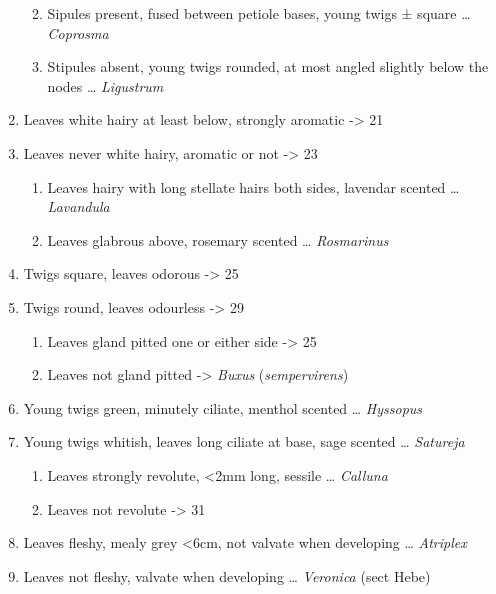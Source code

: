 \documentclass[openany]{book}
\providecommand{\tightlist}{%
  \setlength{\itemsep}{0pt}\setlength{\parskip}{0pt}}
\begin{document}
\begin{enumerate}
  \begin{enumerate}
  \def\labelenumii{\arabic{enumii}.}
  \setcounter{enumii}{16}
  \tightlist
  \item
    Sipules present, fused between petiole bases, young twigs ± square \ldots{} \emph{Coprosma}
  \item
    Stipules absent, young twigs rounded, at most angled slightly below the nodes \ldots{} \emph{Ligustrum}
  \end{enumerate}
\item
  Leaves white hairy at least below, strongly aromatic -\textgreater{} 21
\item
  Leaves never white hairy, aromatic or not -\textgreater{} 23

  \begin{enumerate}
  \def\labelenumii{\arabic{enumii}.}
  \setcounter{enumii}{20}
  \tightlist
  \item
    Leaves hairy with long stellate hairs both sides, lavendar scented \ldots{} \emph{Lavandula}
  \item
    Leaves glabrous above, rosemary scented \ldots{} \emph{Rosmarinus}
  \end{enumerate}
\item
  Twigs square, leaves odorous -\textgreater{} 25
\item
  Twigs round, leaves odourless -\textgreater{} 29

  \begin{enumerate}
  \def\labelenumii{\arabic{enumii}.}
  \setcounter{enumii}{24}
  \tightlist
  \item
    Leaves gland pitted one or either side -\textgreater{} 25
  \item
    Leaves not gland pitted -\textgreater{} \emph{Buxus} (\emph{sempervirens})
  \end{enumerate}
\item
  Young twigs green, minutely ciliate, menthol scented \ldots{} \emph{Hyssopus}
\item
  Young twigs whitish, leaves long ciliate at base, sage scented \ldots{} \emph{Satureja}

  \begin{enumerate}
  \def\labelenumii{\arabic{enumii}.}
  \setcounter{enumii}{28}
  \tightlist
  \item
    Leaves strongly revolute, \textless{}2mm long, sessile \ldots{} \emph{Calluna}
  \item
    Leaves not revolute -\textgreater{} 31
  \end{enumerate}
\item
  Leaves fleshy, mealy grey \textless{}6cm, not valvate when developing \ldots{} \emph{Atriplex}
\item
  Leaves not fleshy, valvate when developing \ldots{} \emph{Veronica} (sect Hebe)
\end{enumerate}
\end{document}
